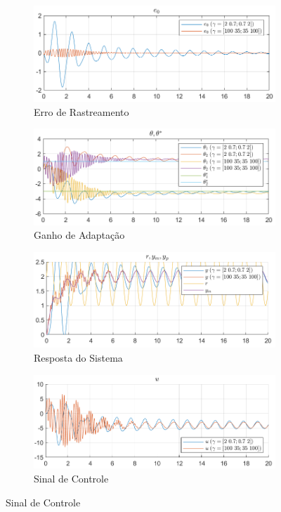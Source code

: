\documentclass[10pt]{article}
\begin{document}
\begin{figure}[h!]
    \centering
    \begin{subfigure}[b]{0.3\textwidth}
        \centering
        \includegraphics[width=\textwidth]{img/fig10a.png}
        \caption{Erro de Rastreamento}
    \end{subfigure}
    \begin{subfigure}[b]{0.3\textwidth}
        \centering
        \includegraphics[width=\textwidth]{img/fig10b.png}
        \caption{Ganho de Adaptação}
    \end{subfigure}

    \begin{subfigure}[b]{0.3\textwidth}
        \centering
        \includegraphics[width=\textwidth]{img/fig10c.png}
        \caption{Resposta do Sistema}
    \end{subfigure}
    \begin{subfigure}[b]{0.3\textwidth}
        \centering
        \includegraphics[width=\textwidth]{img/fig10e.png}
        \caption{Sinal de Controle}
    \end{subfigure}


\end{figure}
\end{document}
